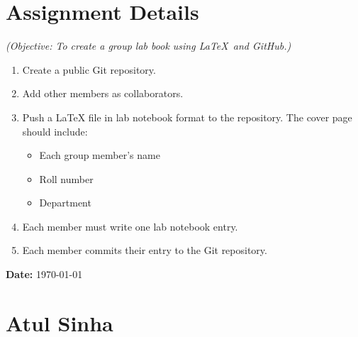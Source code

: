 \documentclass[a4paper,12pt]{article}
\begin{document}
\tableofcontents

\newpage

\section{Assignment Details}
\textit{(Objective: To create a group lab book using \LaTeX \  and GitHub.)}
\begin{enumerate}
    \item Create a public Git repository.
    \item Add other members as collaborators.
    \item Push a LaTeX file in lab notebook format to the repository. The cover page should include:
    \begin{itemize}
        \item Each group member's name
        \item Roll number
        \item Department
    \end{itemize}
    \item Each member must write one lab notebook entry.
    \item Each member commits their entry to the Git repository.
\end{enumerate}

\newpage

{ \textbf{Date:} \today}
\section{Atul Sinha}
\end{document}
